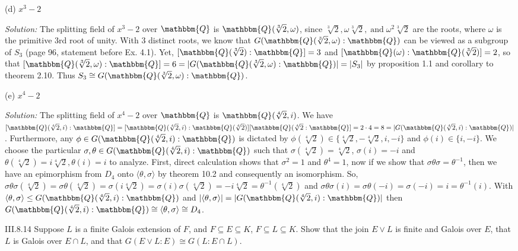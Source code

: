 \documentclass{letter}
\newcommand{\tmem}[1]{{\em #1\/}}
\newcommand{\tmop}[1]{\ensuremath{\operatorname{#1}}}
\begin{document}
(d) $x^3 - 2$

{\tmem{Solution:}} The splitting field of $x^3 - 2$ over $\mathbbm{Q}$ is
$\mathbbm{Q}( \sqrt[3]{2}, \omega)$, since $\sqrt[3]{2}, \omega \sqrt[3]{2},
\tmop{and} \omega^2 \sqrt[3]{2}$ are the roots, where $\omega$ is the
primitive 3rd root of unity. With 3 distinct roots, we know that $G
(\mathbbm{Q}( \sqrt[3]{2}, \omega) : \mathbbm{Q})$ can be viewed as a subgroup
of $S_3$ (page 96, statement before Ex. 4.1). Yet, $[\mathbbm{Q}( \sqrt[3]{2})
: \mathbbm{Q}] = 3$ and $[\mathbbm{Q}(\omega) : \mathbbm{Q}( \sqrt[3]{2})] =
2$, so that $[\mathbbm{Q}( \sqrt[3]{2}, \omega) : \mathbbm{Q}] = 6 = |G
(\mathbbm{Q}( \sqrt[3]{2}, \omega) : \mathbbm{Q}) | = |S_3 |$ by proposition
1.1 and corollary to theorem 2.10. Thus $S_3 \cong G (\mathbbm{Q}(
\sqrt[3]{2}, \omega) : \mathbbm{Q})$.

(e) $x^4 - 2$

{\tmem{Solution:}} The splitting field of $x^4 - 2$ over $\mathbbm{Q}$ is
$\mathbbm{Q}( \sqrt[4]{2}, i)$. We have $[\mathbbm{Q}( \sqrt[4]{2}, i) :
\mathbbm{Q}] = [ \text{$\mathbbm{Q}( \sqrt[4]{2}, i)$} : \mathbbm{Q}(
\sqrt[4]{2})] [\mathbbm{Q}( \sqrt[4]{2} : \mathbbm{Q}] = 2 \cdot 4 = 8 = |G
(\mathbbm{Q}( \sqrt[4]{2}, i) : \mathbbm{Q}) |$. Furthermore, any $\phi \in G
( \mathbbm{Q}( \sqrt[4]{2}, i) : \mathbbm{Q})$ is dictated by $\phi (
\sqrt[4]{2}) \in \{ \sqrt[4]{2}, - \sqrt[4]{2}, i, - i\}$ and $\phi (i) \in
\{i, - i\}$. We choose the particular $\sigma, \theta \in G ( \mathbbm{Q}(
\sqrt[4]{2}, i) : \mathbbm{Q})$ such that $\sigma ( \sqrt[4]{2}) =
\sqrt[4]{2}$, $\sigma (i) = - i$ and $\theta ( \sqrt[4]{2}) = i \sqrt[4]{2},
\theta (i) = i$ to analyze. First, direct calculation shows that $\sigma^2 =
1$ and $\theta^4 = 1$, now if we show that $\sigma \theta \sigma = \theta^{-
1}$, then we have an epimorphism from $D_4$ onto $\langle \theta, \sigma
\rangle$ by theorem 10.2 and consequently an isomorphism. So, $\sigma \theta
\sigma ( \sqrt[4]{2}) = \sigma \theta ( \sqrt[4]{2}) = \sigma (i \sqrt[4]{2})
= \sigma (i) \sigma ( \sqrt[4]{2}) = - i \sqrt[4]{2} = \theta^{- 1} (
\sqrt[4]{2})$ and $\sigma \theta \sigma (i) = \sigma \theta (- i) = \sigma (-
i) = i = \theta^{- 1} (i)$. With $\langle \theta, \sigma \rangle \leq G
(\mathbbm{Q}( \sqrt[4]{2}, i) : \mathbbm{Q})$ and $| \langle \theta, \sigma
\rangle | = |G (\mathbbm{Q}( \sqrt[4]{2}, i) : \mathbbm{Q}) |$ then $G
(\mathbbm{Q}( \sqrt[4]{2}, i) : \mathbbm{Q}) \cong \langle \theta, \sigma
\rangle \cong D_4$.

III.8.14 Suppose $L$ is a finite Galois extension of $F$, and $F \subseteq E
\subseteq K$, $F \subseteq L \subseteq K$. Show that the join $E \vee L$ is
finite and Galois over $E$, that $L$ is Galois over $E \cap L$, and that $G (E
\vee L : E) \cong G (L : E \cap L)$.
\end{document}
